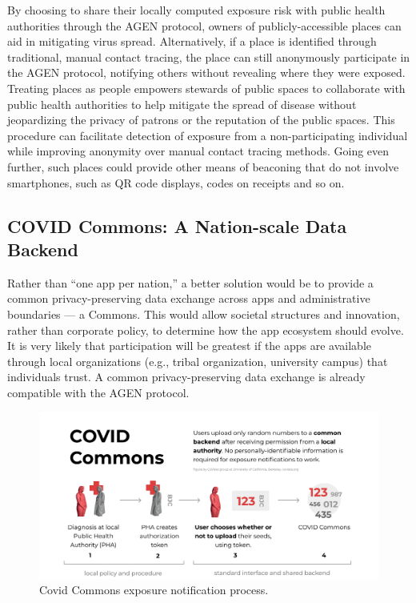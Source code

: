 By choosing to share their locally computed exposure risk with public health authorities through the AGEN protocol, owners of publicly-accessible places can aid in mitigating virus spread. 
Alternatively, if a place is identified through traditional, manual contact tracing, the place can still anonymously participate in the AGEN protocol, notifying others without revealing where they were exposed. 
Treating places as people empowers stewards of public spaces to collaborate with public health authorities to help mitigate the spread of disease without jeopardizing the privacy of patrons or the reputation of the public spaces.
This procedure can facilitate detection of exposure from a non-participating individual while improving anonymity over manual contact tracing methods.  Going even further, such places could provide other means of beaconing that do not involve smartphones, such as QR code displays, codes on receipts and so on.

\subsection*{COVID Commons: A Nation-scale Data Backend}

Rather than “one app per nation,” a better solution would be to provide a common privacy-preserving data exchange across apps and administrative boundaries — a Commons.  This would allow societal structures and innovation, rather than corporate policy, to determine how the app ecosystem should evolve.  It is very likely that participation will be greatest if the apps are available through local organizations (e.g., tribal organization, university campus) that individuals trust.   A common privacy-preserving data exchange is already compatible with the AGEN protocol.

\begin{figure}[h]
    \centering
    \includegraphics[width=\textwidth]{figs/covid_commons.pdf}
    \caption{Covid Commons exposure notification process.}
    \label{fig:commoms}
\end{figure}

